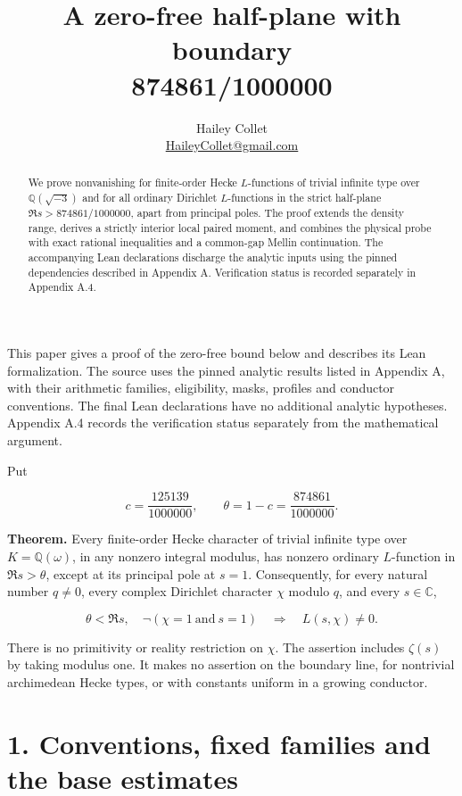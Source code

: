 \documentclass[11pt,a4paper]{article}
\title{\vspace{-1.3em}A zero-free half-plane with boundary\\874861/1000000}
\author{Hailey Collet\\\small\href{mailto:HaileyCollet@gmail.com}{HaileyCollet@gmail.com}}
\date{}
\begin{document}
\maketitle
\vspace{-1.5em}
\begin{abstract}
We prove nonvanishing for finite-order Hecke $L$-functions of trivial infinite type over $\mathbb Q(\sqrt{-3})$ and for all ordinary Dirichlet $L$-functions in the strict half-plane $\Re s>874861/1000000$, apart from principal poles. The proof extends the density range, derives a strictly interior local paired moment, and combines the physical probe with exact rational inequalities and a common-gap Mellin continuation. The accompanying Lean declarations discharge the analytic inputs using the pinned dependencies described in Appendix A. Verification status is recorded separately in Appendix A.4.
\end{abstract}

This paper gives a proof of the zero-free bound below and describes its
Lean formalization. The source uses the pinned analytic results listed
in Appendix A, with their arithmetic families, eligibility, masks,
profiles and conductor conventions. The final Lean declarations have no
additional analytic hypotheses. Appendix A.4 records the verification
status separately from the mathematical argument.

Put

\[
c=\frac{125139}{1000000},\qquad
\theta=1-c=\frac{874861}{1000000}.
\]

\textbf{Theorem.} Every finite-order Hecke character of trivial infinite
type over \(K=\mathbb Q(\omega)\), in any nonzero integral modulus, has
nonzero ordinary \(L\)-function in \(\Re s>\theta\), except at its
principal pole at \(s=1\). Consequently, for every natural number
\(q\ne0\), every complex Dirichlet character \(\chi\) modulo \(q\), and
every \(s\in\mathbb C\),

\[
\theta<\Re s,\quad\neg(\chi=1\ \text{and}\ s=1)
\quad\Longrightarrow\quad L(s,\chi)\ne0.
\tag{T}
\]

There is no primitivity or reality restriction on \(\chi\). The
assertion includes \(\zeta(s)\) by taking modulus one. It makes no
assertion on the boundary line, for nontrivial archimedean Hecke types,
or with constants uniform in a growing conductor.

\hypertarget{conventions-fixed-families-and-the-base-estimates}{%
\section{1. Conventions, fixed families and the base
estimates}\label{conventions-fixed-families-and-the-base-estimates}}
\end{document}
